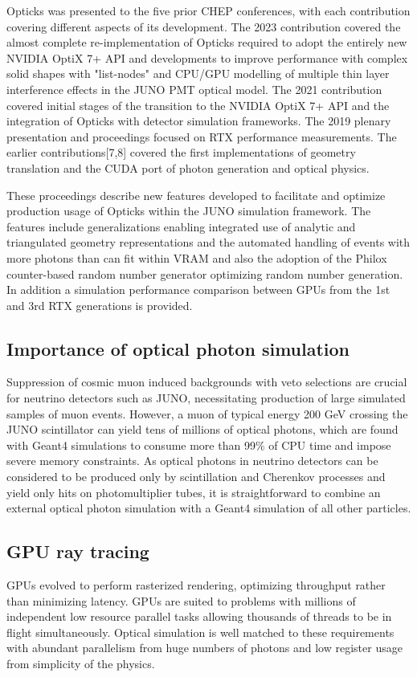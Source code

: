 \documentclass{webofc}
\begin{document}
Opticks was presented to the five prior CHEP conferences, with each contribution
covering different aspects of its development. The 2023 contribution\cite{chep2023} 
covered the almost complete re-implementation of Opticks required to adopt the entirely new NVIDIA OptiX 7+ API
and developments to improve performance with complex solid shapes with "list-nodes" and CPU/GPU 
modelling of multiple thin layer interference effects in the JUNO PMT optical model. 
%
The 2021 contribution\cite{chep2021} covered initial stages of the transition to the NVIDIA OptiX 7+ API and 
the integration of Opticks with detector simulation frameworks. 
The 2019 plenary presentation and proceedings\cite{chep2019} focused on RTX\cite{rtx} performance measurements.
The earlier contributions[7,8] covered the first 
implementations of geometry translation and the CUDA port of photon generation and optical physics.


These proceedings describe new features developed to facilitate and optimize production usage of Opticks 
within the JUNO simulation framework. The features include generalizations enabling 
integrated use of analytic and triangulated geometry representations and the automated handling of 
events with more photons than can fit within VRAM and also the adoption
of the Philox counter-based random number generator optimizing random number generation.
In addition a simulation performance comparison between GPUs from the 1st and 3rd RTX generations
is provided. 
%
%
\subsection{Importance of optical photon simulation}%
%
%
Suppression of cosmic muon induced backgrounds with veto selections are crucial for neutrino
detectors such as JUNO\cite{juno}, necessitating production of large simulated samples of muon events. 
However, a muon of typical energy 200 GeV crossing the JUNO scintillator can yield tens of millions of 
optical photons, which are found with Geant4 simulations to consume more than 99\% of CPU time
and impose severe memory constraints.
%
As optical photons in neutrino detectors can be considered to be produced
only by scintillation and Cherenkov processes and yield only hits
on photomultiplier tubes, it is straightforward to combine an external optical photon simulation 
with a Geant4 simulation of all other particles.
%
\subsection{GPU ray tracing}%
%
GPUs evolved to perform rasterized rendering, optimizing throughput\cite{throughput} rather than minimizing latency.
GPUs are suited to problems with millions of independent low resource parallel tasks allowing thousands of threads 
to be in flight simultaneously.
Optical simulation is well matched to these requirements with abundant parallelism 
from huge numbers of photons and low register usage from simplicity of the physics.
\end{document}
